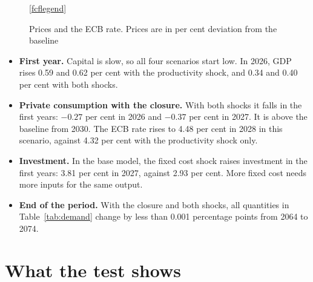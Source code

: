 \documentclass[11pt,a4paper]{article}
\newcommand{\fourlines}[1]{%
  \addplot[closureP] table[x=year, y=#1FP]{\fcfdata};
  \addplot[baseP] table[x=year, y=#1BP]{\fcfdata};
  \addplot[closureQ] table[x=year, y=#1FQ]{\fcfdata};
  \addplot[baseQ] table[x=year, y=#1BQ]{\fcfdata};
}
\begin{document}
\begin{figure}[H]
\centering
{}

\ref{fcflegend}
\caption{Prices and the ECB rate. Prices are in per cent deviation from the baseline}
\label{fig:prices}
\end{figure}

\FloatBarrier
\begin{itemize}
\item \textbf{First year.} Capital is slow, so all four scenarios start low. In 2026, GDP rises 0.59 and 0.62 per cent with the productivity shock, and 0.34 and 0.40 per cent with both shocks.
\item \textbf{Private consumption with the closure.} With both shocks it falls in the first years: $-0.27$ per cent in 2026 and $-0.37$ per cent in 2027. It is above the baseline from 2030. The ECB rate rises to 4.48 per cent in 2028 in this scenario, against 4.32 per cent with the productivity shock only.
\item \textbf{Investment.} In the base model, the fixed cost shock raises investment in the first years: 3.81 per cent in 2027, against 2.93 per cent. More fixed cost needs more inputs for the same output.
\item \textbf{End of the period.} With the closure and both shocks, all quantities in Table~\ref{tab:demand} change by less than 0.001 percentage points from 2064 to 2074.
\end{itemize}

\section{What the test shows}
\end{document}
